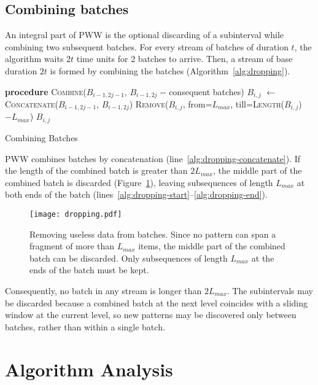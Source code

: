 \documentclass[runningheads,a4paper]{llncs}
\begin{document}
\subsection{Combining batches}
\label{sec:combining-batches}

An integral part of PWW is the optional discarding of a subinterval while
combining two subsequent batches.  For every stream of batches of
duration $t$, the algorithm waits $2t$ time units for 2 batches to
arrive.  Then, a stream of base duration $2t$ is formed by combining
the batches (Algorithm~\ref{alg:dropping}).
\begin{algorithm}
    \begin{algorithmic}[1]
    \STATE \textbf{procedure} \textsc{Combine}($B_{i-1,2j-1}$,
        $B_{i-1,2j}$ -{}- consequent batches)
    \STATE $B_{i, j}$ $\gets$ \textsc{Concatenate}($B_{i-1,2j-1}$, $B_{i-1,2j}$) \label{alg:dropping-concatenate}
     \label{alg:dropping-start}
       \STATE \textsc{Remove}($B_{i, j}$, from=$L_{max}$, till=\textsc{Length}($B_{i, j}$)$- L_{max}$)
    \ENDIF \label{alg:dropping-end}
	\RETURN $B_{i, j}$
\end{algorithmic}
\caption{Combining Batches}
\label{alg:dropping}
\end{algorithm}
PWW combines batches by concatenation
(line~\ref{alg:dropping-concatenate}). If the length of the combined
batch is greater than $2L_{max}$, the middle part of the combined
batch is discarded (Figure~\ref{fig:dropping}), leaving subsequences
of length $L_{max}$ at both ends of the batch
(lines~\ref{alg:dropping-start}--\ref{alg:dropping-end}).
\begin{figure}
    \centering
	\texttt{[image: dropping.pdf]}
	\caption{Removing useless data from batches. Since no
    pattern can span a fragment of more than $L_{max}$ items,
    the middle part of the combined batch can be discarded.
    Only subsequences of length $L_{max}$ at the ends of the
    batch must be kept.}
    \label{fig:dropping}
\end{figure}
Consequently, no batch in any stream is longer than $2L_{max}$. The
subintervals may be discarded because a combined batch at the next level
coincides with a sliding window at the current level, so new patterns may be
discovered only between batches, rather than within a single batch.

\section{Algorithm Analysis}
\label{sec:analysis}
\end{document}
